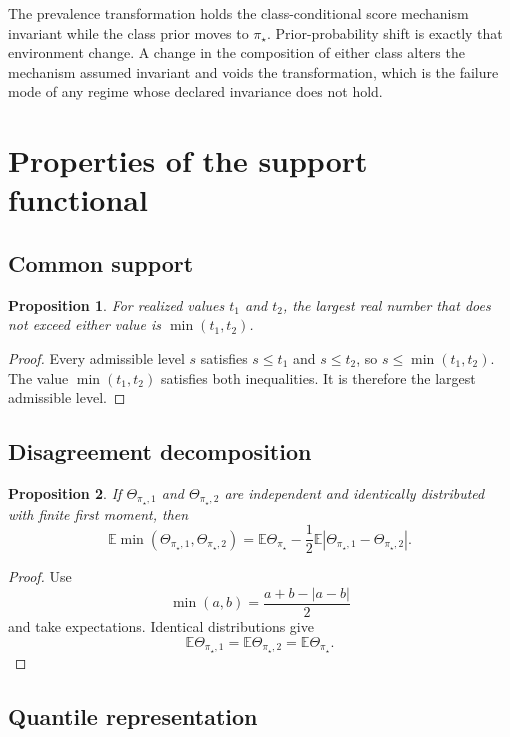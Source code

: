 \documentclass[11pt]{article}
\newcommand{\E}{\mathbb{E}}
\newtheorem{proposition}{Proposition}
\theoremstyle{remark}
\begin{document}
The prevalence transformation holds the class-conditional score mechanism invariant while the class prior moves to $\pi_\star$. Prior-probability shift is exactly that environment change. A change in the composition of either class alters the mechanism assumed invariant and voids the transformation, which is the failure mode of any regime whose declared invariance does not hold.

\section{Properties of the support functional}
\label{app:properties}

\subsection{Common support}

\begin{proposition}
For realized values $t_1$ and $t_2$, the largest real number that does not exceed either value is $\min(t_1,t_2)$.
\end{proposition}

\begin{proof}
Every admissible level $s$ satisfies $s\leq t_1$ and $s\leq t_2$, so $s\leq\min(t_1,t_2)$. The value $\min(t_1,t_2)$ satisfies both inequalities. It is therefore the largest admissible level.
\end{proof}

\subsection{Disagreement decomposition}

\begin{proposition}
If $\Theta_{\pi_\star,1}$ and $\Theta_{\pi_\star,2}$ are independent and identically distributed with finite first moment, then
\[
\E\min(\Theta_{\pi_\star,1},\Theta_{\pi_\star,2})
=
\E\Theta_{\pi_\star}
-
\frac12
\E|\Theta_{\pi_\star,1}-\Theta_{\pi_\star,2}|.
\]
\end{proposition}

\begin{proof}
Use
\[
\min(a,b)=\frac{a+b-|a-b|}{2}
\]
and take expectations. Identical distributions give
\[
\E\Theta_{\pi_\star,1}
=
\E\Theta_{\pi_\star,2}
=
\E\Theta_{\pi_\star}.
\]
\end{proof}

\subsection{Quantile representation}
\end{document}
